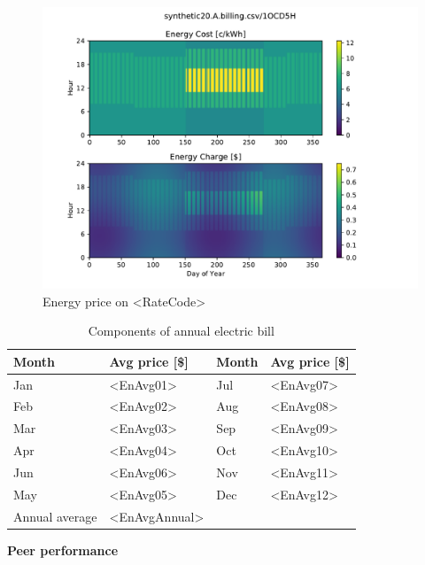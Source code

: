 \documentclass[11pt]{article}
\begin{document}
\begin{figure}[!h]
\centering
\includegraphics[width=\columnwidth, page=1, trim=0in 3in 0in 0.45in, clip]{visuals/synthetic20.A.billing.Heatmaps.pdf}
\caption{Energy price on <RateCode>}
\label{fig:toumap}
\end{figure}

\lipsum[1][1-7]

\begin{table}[th!]
  \centering
  \caption{Components of annual electric bill}
  \vspace{1.5ex}
  \label{tab:annual}
  \begin{tabular}{llll}
    Month & Avg price [\$] & Month & Avg price [\$] \\
    \midrule
    Jan & <EnAvg01> & Jul & <EnAvg07> \\
    Feb & <EnAvg02> & Aug & <EnAvg08> \\
    Mar & <EnAvg03> & Sep & <EnAvg09> \\
    Apr & <EnAvg04> & Oct & <EnAvg10> \\
    Jun & <EnAvg06> & Nov & <EnAvg11> \\
    May & <EnAvg05> & Dec & <EnAvg12> \\
    \midrule
    Annual average & <EnAvgAnnual>
  \end{tabular}
\end{table}

\vspace{3ex}
\textbf{\Large Peer performance}
\vspace{1ex}

\lipsum[1][1-7]
\end{document}
